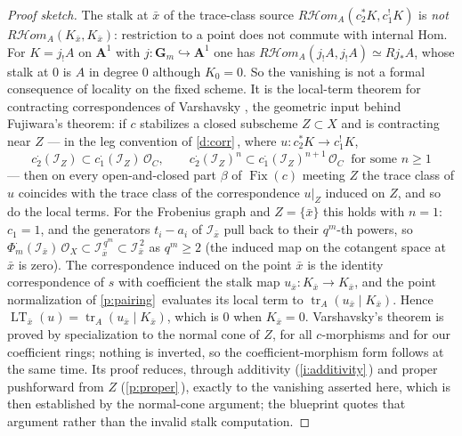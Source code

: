 \documentclass[11pt]{article}
\theoremstyle{plain}
\theoremstyle{definition}
\newcommand{\Cref}[1]{\hyperref[#1]{\ref{#1}}\,\hyperref[#1]{\nameref*{#1}}}
\newcommand{\RHom}{R\mathcal Hom_A}
\newcommand{\Fix}{\operatorname{Fix}}
\newcommand{\tr}{\operatorname{tr}}
\newcommand{\LT}{\operatorname{LT}}
\begin{document}
\begin{proof}[Proof sketch]
The stalk at $\bar x$ of the trace-class source $\RHom(c_2^*K,c_1^!K)$ is
\emph{not} $\RHom(K_{\bar x},K_{\bar x})$:  restriction to a point does not
commute with internal Hom.  For $K=j_!A$ on $\mathbf A^1$ with
$j:\mathbf G_m\hookrightarrow\mathbf A^1$ one has $\RHom(j_!A,j_!A)\simeq Rj_*A$,
whose stalk at $0$ is $A$ in degree $0$ although $K_0=0$.  So the vanishing
is not a formal consequence of locality on the fixed scheme.  It is the
local-term theorem for contracting correspondences of Varshavsky
\cite[Def.~2.1.1, Thm.~2.1.3]{varsh}, the geometric input behind
Fujiwara's theorem:  if $c$ stabilizes a closed subscheme $Z\subset X$ and
is contracting near $Z$ --- in the leg convention of \Cref{d:corr}, where
$u:c_2^*K\to c_1^!K$,
\[
 c_2^{\cdot}(\mathcal I_Z)\subset c_1^{\cdot}(\mathcal I_Z)\,\mathcal O_C,
 \qquad
 c_2^{\cdot}(\mathcal I_Z)^n\subset c_1^{\cdot}(\mathcal I_Z)^{n+1}\,\mathcal O_C
 \ \text{ for some }n\ge1
\]
--- then on every open-and-closed part $\beta$ of $\Fix(c)$ meeting $Z$ the
trace class of $u$ coincides with the trace class of the correspondence
$u|_Z$ induced on $Z$, and so do the local terms.  For the Frobenius graph
and $Z=\{\bar x\}$ this holds with $n=1$:  $c_1=1$, and the generators
$t_i-a_i$ of $\mathcal I_{\bar x}$ pull back to their $q^m$-th powers, so
$\Phi_m^{\cdot}(\mathcal I_{\bar x})\,\mathcal O_X\subset\mathcal I_{\bar x}^{\,q^m}\subset\mathcal I_{\bar x}^{\,2}$
as $q^m\ge2$ (the induced map on the cotangent space at $\bar x$ is zero).
The correspondence induced on the point $\bar x$ is the identity
correspondence of $s$ with coefficient the stalk map
$u_{\bar x}:K_{\bar x}\to K_{\bar x}$, and the point normalization of
\Cref{p:pairing} evaluates its local term to $\tr_A(u_{\bar x}\mid K_{\bar x})$.
Hence $\LT_{\bar x}(u)=\tr_A(u_{\bar x}\mid K_{\bar x})$, which is $0$ when
$K_{\bar x}=0$.  Varshavsky's theorem is proved by specialization to the
normal cone of $Z$, for all $c$-morphisms and for our coefficient rings;
nothing is inverted, so the coefficient-morphism form follows at the same
time.  Its proof reduces, through additivity (\Cref{i:additivity}) and
proper pushforward from $Z$ (\Cref{p:proper}), exactly to the vanishing
asserted here, which is then established by the normal-cone argument;  the
blueprint quotes that argument rather than the invalid stalk computation.
\end{proof}
\end{document}
